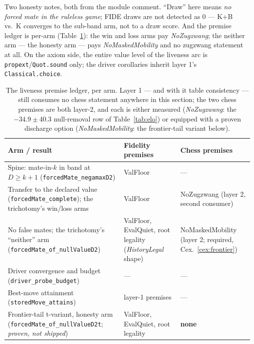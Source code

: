 \documentclass[11pt]{article}
\theoremstyle{plain}
\theoremstyle{definition}
\theoremstyle{remark}
\begin{document}
Two honesty notes, both from the module comment.  ``Draw'' here means
\emph{no forced mate in the ruleless game}; FIDE draws are not
detected as $0$ --- K+B vs.\ K converges to the sub-band arm, not to a
draw score.  And the premise ledger is per-arm
(Table~\ref{tab:liveledger}): the win and loss arms pay
\emph{NoZugzwang}; the neither arm --- the honesty arm --- pays
\emph{NoMaskedMobility} and no zugzwang statement at all.  On the
axiom side, the entire value level of the liveness arc is
\texttt{propext}/\texttt{Quot.sound} only; the driver corollaries
inherit layer 1's \texttt{Classical.choice}.

\begin{table}[t]
\centering
\footnotesize
\begin{tabular}{@{}p{4.1cm}p{4.3cm}p{4.6cm}@{}}
\toprule
\textbf{Arm / result} & \textbf{Fidelity premises} & \textbf{Chess premises}\\
\midrule
Spine: mate-in-$k$ in band at $D \ge k+1$ (\texttt{forcedMate\_negamaxD2}) &
ValFloor & ---\\
Transfer to the declared value (\texttt{forcedMate\_complete}); the
trichotomy's win/loss arms &
ValFloor & NoZugzwang (layer 2, second consumer)\\
No false mates; the trichotomy's ``neither'' arm
(\texttt{forcedMate\_of\_nullValueD2}) &
ValFloor, EvalQuiet, root legality (\emph{HistoryLegal} shape) &
NoMaskedMobility (layer 2; required, Cex.~\ref{cex:frontier})\\
Driver convergence and budget (\texttt{driver\_probe\_budget}) &
--- & ---\\
Best-move attainment (\texttt{storedMove\_attains}) &
layer-1 premises & ---\\
Frontier-tail t-variant, honesty arm
(\texttt{forcedMate\_of\_nullValueD2t}; \emph{proven, not shipped}) &
ValFloor, EvalQuiet, root legality & \textbf{none}\\
\bottomrule
\end{tabular}
\caption{The liveness premise ledger, per arm.  Layer 1 --- and with
it table consistency --- still consumes no chess statement anywhere in
this section; the two chess premises are both layer-2, and each is
either measured (\emph{NoZugzwang}: the $-34.9 \pm 40.3$ null-removal
row of Table~\ref{tab:elo}) or equipped with a proven discharge
option (\emph{NoMaskedMobility}: the frontier-tail variant below).}
\label{tab:liveledger}
\end{table}
\end{document}
